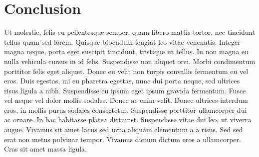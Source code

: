 \chapter{Conclusion}
Ut molestie, felis eu pellentesque semper, quam libero mattis tortor, nec tincidunt tellus quam sed lorem. Quisque bibendum feugiat leo vitae venenatis. Integer magna neque, porta eget suscipit tincidunt, tristique ut tellus. In non magna eu nulla vehicula cursus in id felis. Suspendisse non aliquet orci. Morbi condimentum porttitor felis eget aliquet. Donec eu velit non turpis convallis fermentum eu vel eros. Duis egestas, mi eu pharetra egestas, nunc dui porta neque, sed ultrices risus ligula a nibh. Suspendisse eu ipsum eget ipsum gravida fermentum. Fusce vel neque vel dolor mollis sodales. Donec ac enim velit. Donec ultrices interdum eros, in mollis purus sodales consectetur. Suspendisse porttitor ullamcorper dui ac ornare. In hac habitasse platea dictumst. Suspendisse vitae dui leo, ut viverra augue. Vivamus sit amet lacus sed urna aliquam elementum a a risus. Sed sed erat non metus pulvinar tempor. Vivamus dictum dictum eros a ullamcorper. Cras sit amet massa ligula.